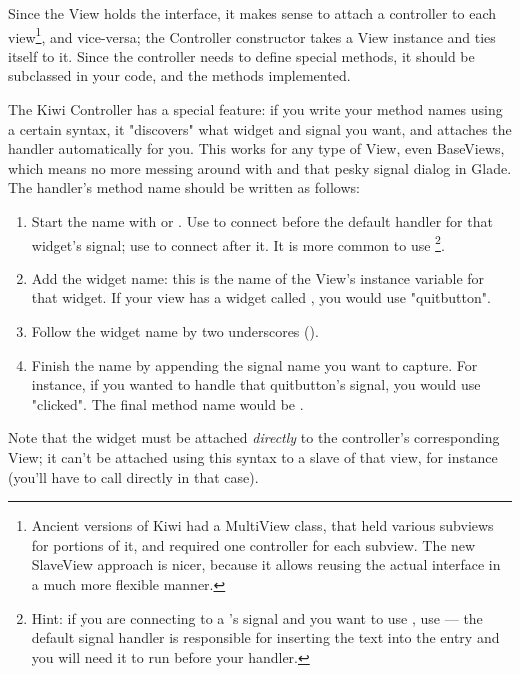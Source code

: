 \documentclass[a4paper]{howto}
\begin{document}
Since the View holds the interface, it makes sense to attach a
controller to each view\footnote{Ancient versions of Kiwi had a
MultiView class, that held various subviews for portions of it, and
required one controller for each subview. The new SlaveView approach is
nicer, because it allows reusing the actual interface in a much more
flexible manner.}, and vice-versa; the Controller constructor takes a
View instance and ties itself to it. Since the controller needs to
define special methods, it should be subclassed in your code, and the
methods implemented.

The Kiwi Controller has a special feature: if you write your method
names using a certain syntax, it "discovers" what widget and signal you
want, and attaches the handler automatically for you. This works for any
type of View, even BaseViews, which means no more messing around with
 and that pesky signal dialog in Glade. The
handler's method name should be written as follows:

\begin{enumerate}
\item Start the name with  or . Use  to
connect before the default handler for that widget's signal; use
 to connect after it. It is more common to use
\footnote{Hint: if you are connecting
to a 's  signal and you want to use
, use 
--- the default signal handler is responsible for inserting the text
into the entry and you will need it to run before your handler.}.

\item Add the widget name: this is the name of the View's instance
variable for that widget.  If your view has a widget called
, you would use "quitbutton".

\item Follow the widget name by two underscores (\code{\_\_}).

\item Finish the name by appending the signal name you want to capture.
For instance, if you wanted to handle that quitbutton's 
signal, you would use "clicked". The final method name would be
.
\end{enumerate}

Note that the widget must be attached {\it directly} to the controller's
corresponding View; it can't be attached using this syntax to a slave of
that view, for instance (you'll have to call  directly
in that case).
\end{document}
